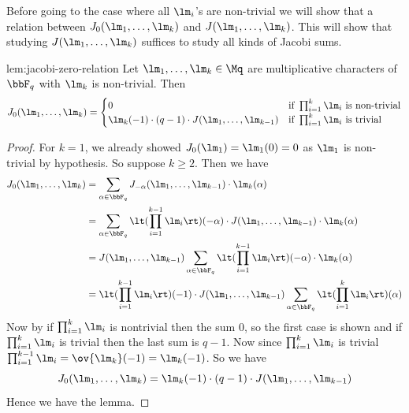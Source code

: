 Before going to the case where all $\lm_i$'s are non-trivial we will show that a relation between $J_0(\lm_1,\dots,\lm_k)$ and $J(\lm_1,\dots, \lm_k)$. This will show that studying $J(\lm_1,\dots, \lm_k)$ suffices to study all kinds of Jacobi sums. 
\begin{lemma}{}{lem:jacobi-zero-relation}
  Let $\lm_1,\dots,\lm_k\in\Mq$ are multiplicative characters of $\bbF_q$ with $\lm_k$ is non-trivial. Then $$J_0(\lm_1,\dots,\lm_k)=\begin{cases}
    0 &\text{if }\prod_{i=1}^k\lm_i\text{ is non-trivial}\\
    \lm_k(-1)\cdot (q-1)\cdot J(\lm_1,\dots,\lm_{k-1}) & \text{if }\prod_{i=1}^k\lm_i\text{ is trivial}
  \end{cases}$$
\end{lemma}
\begin{proof}
  For $k=1$, we already showed $J_0(\lm_1)=\lm_1(0)=0$ as $\lm_1$ is non-trivial by hypothesis. So suppose $k\geq 2$. Then we have 
  \begin{align*}
    J_0(\lm_1,\dots,\lm_k) & = \sum_{\alpha\in\bbF_q}J_{-\alpha}(\lm_1,\dots,\lm_{k-1})\cdot \lm_k(\alpha)\\ 
    & = \sum_{\alpha\in\bbF_q}\lt(\prod_{i=1}^{k-1}\lm_i\rt)(-\alpha)\cdot J(\lm_1,\dots,\lm_{k-1})\cdot \lm_k(\alpha)\\ 
    & = J(\lm_1,\dots,\lm_{k-1})\sum_{\alpha\in\bbF_q}\lt(\prod_{i=1}^{k-1}\lm_i\rt)(-\alpha)\cdot \lm_k(\alpha)\\
    & = \lt(\prod_{i=1}^{k-1}\lm_i\rt)(-1)\cdot J(\lm_1,\dots,\lm_{k-1})\sum_{\alpha\in\bbF_q}\lt(\prod_{i=1}^{k}\lm_i\rt)(\alpha)
  \end{align*}
  Now by  if $\prod_{i=1}^{k}\lm_i$ is nontrivial then  the sum $0$, so the first case is shown and if $\prod_{i=1}^{k}\lm_i$ is trivial then the last sum is $q-1$. Now since $\prod_{i=1}^{k}\lm_i$ is trivial $\prod_{i=1}^{k-1}\lm_i=\ov{\lm_k}(-1)=\lm_k(-1)$. So we have $$J_0(\lm_1,\dots,\lm_k)=\lm_k(-1)\cdot (q-1)\cdot J(\lm_1,\dots,\lm_{k-1})$$Hence we have the lemma.
\end{proof}

